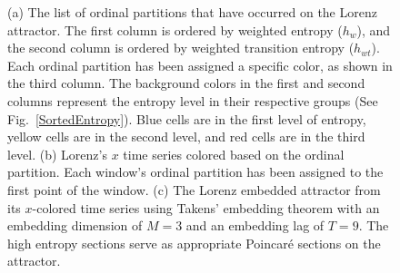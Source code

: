 \documentclass[%
 aip,
 amsmath,amssymb,
 reprint,%
]{revtex4-1}
\begin{document}
\begin{figure}[htbp]
    \caption{(a) The list of ordinal partitions that have occurred on the Lorenz attractor. The first column is ordered by weighted entropy ($h_w$), and the second column is ordered by weighted transition entropy ($h_{wt}$). Each ordinal partition has been assigned a specific color, as shown in the third column. The background colors in the first and second columns represent the entropy level in their respective groups (See Fig.~\ref{SortedEntropy}). Blue cells are in the first level of entropy, yellow cells are in the second level, and red cells are in the third level. (b) Lorenz's $x$ time series colored based on the ordinal partition. Each window's ordinal partition has been assigned to the first point of the window. (c) The Lorenz embedded attractor from its $x$-colored time series using Takens' embedding theorem with an embedding dimension of $M=3$ and an embedding lag of $T = 9$. The high entropy sections serve as appropriate Poincar\'e sections on the attractor.}
    \label{LorenzColoredOP}
\end{figure}
\end{document}
